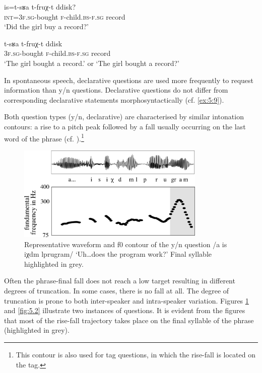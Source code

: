 \ea\label{ex:5:8}
\gll  is=t-sʁa t-fruχ-t ddisk? \\
      \textsc{int=3f.sg}-bought \textsc{f}-child.\textsc{bs-f.sg} record\\
\glt  ‘Did the girl buy a record?’ 
\z

\ea\label{ex:5:9}
\gll  t-sʁa	t-fruχ-t ddisk \\
      \textsc{3f.sg}-bought \textsc{f}-child.\textsc{bs-f.sg}	record \\
\glt ‘The girl bought a record.’ or ‘The girl bought a record?’
\z

In spontaneous speech, declarative questions are used more frequently to request information than y/n questions. Declarative questions do not differ from corresponding declarative statements morphosyntactically (cf. \ref{ex:5:9}). 
   
Both question types (y/n, declarative) are characterised by similar intonation contours: a rise to a pitch peak followed by a fall usually occurring on the last word of the phrase (cf. ).\footnote{This contour is also used for tag questions, in which the rise-fall is located on the tag.}
 
\begin{figure}
  \centering 
   \includegraphics[width=0.8\textwidth]{figures/Figure_5_1_polar.png}
  \caption{Representative waveform and f0 contour of the y/n question /a is iχdm lprugram/ ‘Uh…does the program work?’ Final syllable highlighted in grey.}
   \label{fig:5.1}
   \end{figure} 
 
Often the phrase-final fall does not reach a low target resulting in different degrees of truncation. In some cases, there is no fall at all. The degree of truncation is prone to both inter-speaker and intra-speaker variation. Figures \ref{fig:5.1} and \ref{fig:5.2} illustrate two instances of questions. It is evident from the figures that most of the rise-fall trajectory takes place on the final syllable of the phrase (highlighted in grey). 

